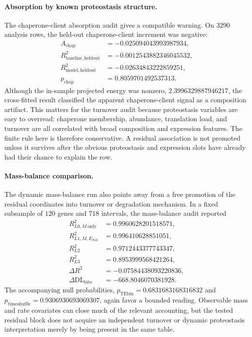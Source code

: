 \paragraph{Absorption by known proteostasis structure.}
The chaperone-client absorption audit gives a compatible warning. On $3290$ analysis rows, the held-out chaperone-client increment was negative:
$$
\begin{aligned}
  A_{\mathrm{chap}} &= -0.025094043993987934,\\
  R^2_{\mathrm{baseline,heldout}} &= -0.0012543882346045532,\\
  R^2_{\mathrm{model,heldout}} &= -0.02634843222859251,\\
  p_{\mathrm{chap}} &= 0.8059701492537313.
\end{aligned}
$$
Although the in-sample projected energy was nonzero, $2.3996329887946217$, the cross-fitted result classified the apparent chaperone-client signal as a composition artifact. This matters for the turnover audit because proteostasis variables are easy to overread: chaperone membership, abundance, translation load, and turnover are all correlated with broad composition and expression features. The finite rule here is therefore conservative. A residual association is not promoted unless it survives after the obvious proteostasis and expression slots have already had their chance to explain the row.

\paragraph{Mass-balance comparison.}
The dynamic mass-balance run also points away from a free promotion of the residual coordinates into turnover or degradation mechanism. In a fixed subsample of $120$ genes and $718$ intervals, the mass-balance audit reported
$$
\begin{aligned}
  R^2_{L0,M\ \mathrm{only}} &= 0.9960628201518571,\\
  R^2_{L1,M,E_{\mathrm{stat}}} &= 0.996410628851051,\\
  R^2_{L2} &= 0.9712443377743347,\\
  R^2_{L3} &= 0.8953999568421264,\\
  \Delta R^2 &= -0.07584438093220836,\\
  \Delta \mathrm{DL}_{\mathrm{bits}} &= -668.8046070381928.
\end{aligned}
$$
The accompanying null probabilities, $p_{\mathrm{TEbin}}=0.6831683168316832$ and $p_{\mathrm{timeshuffle}}=0.9306930693069307$, again favor a bounded reading. Observable mass and rate covariates can close much of the relevant accounting, but the tested residual block does not acquire an independent turnover or dynamic proteostasis interpretation merely by being present in the same table.

